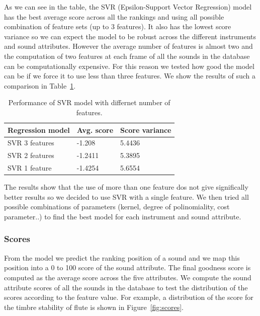 \documentclass{article}
\begin{document}
As we can see in the table, the SVR (Epsilon-Support Vector Regression) model has the best average score across all the rankings and using all possible combination of feature sets (up to 3 features). It also has the lowest score variance so we can expect the model to be robust across the different instruments and sound attributes. However the average number of features is almost two and the computation of two features at each frame of all the sounds in the database can be computationally expensive. For this reason we tested how good the model can be if we force it to use less than three features. We show the results of such a comparison in Table~\ref{svr}.

\begin{table}[]
\centering
\label{my-label}
\begin{tabular}{lll}
\hline
Regression model & Avg. score & Score variance \\ \hline
SVR 3 features   & -1.208     & 5.4436         \\
SVR 2 features   & -1.2411    & 5.3895         \\
SVR 1 feature    & -1.4254    & 5.6554         \\ \hline
\end{tabular}
\caption{Performance of SVR model with differnet number of features.}
\label{svr}
\end{table}

The results show that the use of more than one feature dos not give significally better results so we decided to use SVR with a single feature. We then tried all possible combinations of parameters (kernel, degree of polinomiality, cost parameter..) to find the best model for each instrument and sound attribute.

\subsubsection{Scores}
From the model we predict the ranking position of a sound and we map this position into a 0 to 100 score of the sound attribute. The final goodness score is computed as the average score across the five attributes. We compute the sound attribute scores of all the sounds in the database to test the distribution of the scores according to the feature value. For example, a distribution of the score for the timbre stability of flute is shown in Figure~\ref{fig:scores}.
\end{document}

